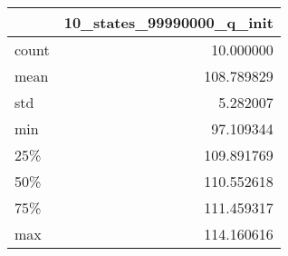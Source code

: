 \begin{tabular}{lr}
\toprule
{} &  10\_states\_99990000\_q\_init \\
\midrule
count &                  10.000000 \\
mean  &                 108.789829 \\
std   &                   5.282007 \\
min   &                  97.109344 \\
25\%   &                 109.891769 \\
50\%   &                 110.552618 \\
75\%   &                 111.459317 \\
max   &                 114.160616 \\
\bottomrule
\end{tabular}
